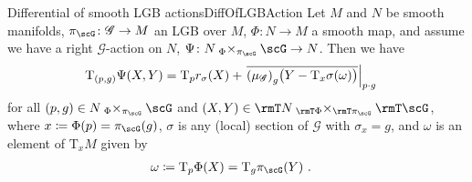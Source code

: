 \documentclass[reqno,a4paper,oneside]{amsart}
\newcommand\fibtimes[2]{\mathbin{_{#1}\times_{#2}}}
\theoremstyle{plain}
\theoremstyle{remark}
\theoremstyle{definition}
\begin{document}
\begin{propositions}{Differential of smooth LGB actions}{DiffOfLGBAction}
Let $M$ and $N$ be smooth manifolds, $\pi_\scG \colon \mathscr{G} \to M$ an LGB over $M$, $\Phi \colon N \to M$ a smooth map, and assume we have a right $\mathscr{G}$-action on $N$, $\Psi\colon N \fibtimes\Phi{\pi_\scG} \scG \to N$. Then we have
\begin{align*}
\mathrm{T}_{(p, g)}\Psi(X, Y)
&=
\mathrm{T}_pr_\sigma(X)
	+ \mleft.{\overline{\mleft( \mu_{\mathscr{G}}\mright)_g \bigl(Y - \mathrm{T}_{x}\sigma (\omega)\bigr)}}\mright|_{p \cdot g}
\end{align*}
for all $(p, g) \in N \fibtimes\Phi{\pi_\scG} \scG$ and $(X, Y) \in \rmT N \fibtimes{\rmT\Phi}{\rmT\pi_\scG} \rmT \scG$, where $x \coloneqq \Phi(p) = \pi_\scG(g)$, $\sigma$ is any (local) section of $\mathscr{G}$ with $\sigma_{x} = g$, and $\omega$ is an element of $\mathrm{T}_xM$ given by
\begin{align*}
\omega
&\coloneqq
\mathrm{T}_p \Phi(X)
= 
\mathrm{T}_g\pi_\scG(Y)~.
\end{align*}
%
\end{propositions}
\end{document}
